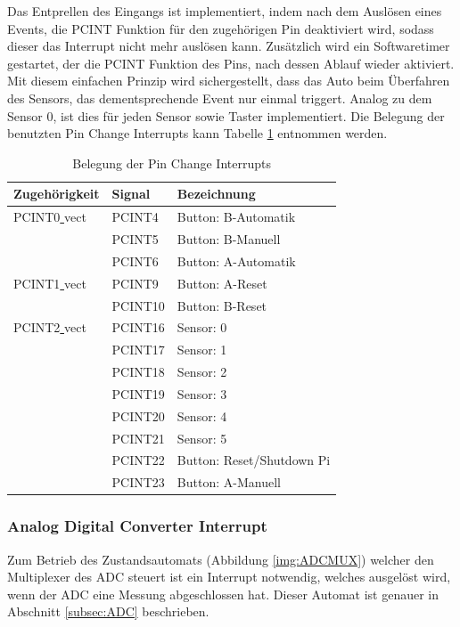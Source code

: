 \documentclass[a4paper, 11pt]{report}
\begin{document}
			Das Entprellen des Eingangs ist implementiert, indem nach dem Auslösen eines Events, die PCINT Funktion für den zugehörigen Pin deaktiviert wird, sodass dieser das Interrupt nicht mehr auslösen kann. Zusätzlich wird ein Softwaretimer gestartet, der die PCINT Funktion des Pins, nach dessen Ablauf wieder aktiviert. Mit diesem einfachen Prinzip wird sichergestellt, dass das Auto beim Überfahren des Sensors, das dementsprechende Event nur einmal triggert.
			Analog zu dem Sensor 0, ist dies für jeden Sensor sowie Taster implementiert. Die Belegung der benutzten Pin Change Interrupts kann Tabelle \ref{tab:belegungpcint} entnommen werden.
			\begin{table}[ht]
				\begin{tabular}{|l|l|l|}
					\hline
					Zugehörigkeit & Signal & Bezeichnung\\
					\hline
					\hline
					PCINT0\underline{ }vect & PCINT4 & Button: B-Automatik\\
					\hline
											& PCINT5 & Button: B-Manuell\\
					\hline
											& PCINT6 & Button: A-Automatik\\
					\hline
					\hline
					PCINT1\underline{ }vect & PCINT9 & Button: A-Reset\\
					\hline
											& PCINT10 & Button: B-Reset\\
					\hline
					\hline
					PCINT2\underline{ }vect & PCINT16 & Sensor: 0\\
					\hline
											& PCINT17 & Sensor: 1\\
					\hline
											& PCINT18 & Sensor: 2\\
					\hline
											& PCINT19 & Sensor: 3\\
					\hline
											& PCINT20 & Sensor: 4\\
					\hline
											& PCINT21 & Sensor: 5\\
					\hline
											& PCINT22 & Button: Reset/Shutdown Pi\\
					\hline
											& PCINT23 & Button: A-Manuell\\
					\hline
				\end{tabular}
				\caption{Belegung der Pin Change Interrupts}
				\label{tab:belegungpcint}
			\end{table}
			\subsubsection{Analog Digital Converter Interrupt}\label{subsubsec:ADCINT}
			Zum Betrieb des Zustandsautomats (Abbildung \ref{img:ADCMUX}) welcher den Multiplexer des ADC steuert ist ein Interrupt notwendig, welches ausgelöst wird, wenn der ADC eine Messung abgeschlossen hat. Dieser Automat ist genauer in Abschnitt \ref{subsec:ADC} beschrieben.
\end{document}
